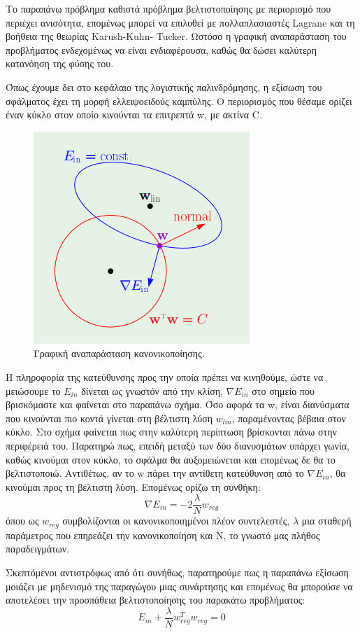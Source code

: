 \documentclass{article}
\begin{document}
Το παραπάνω πρόβλημα καθιστά πρόβλημα βελτιστοποίησης με περιορισμό που περιέχει ανισότητα, επομένως μπορεί να επιλυθεί με πολλαπλασιαστές Lagrane και τη βοήθεια της θεωρίας Karush-Kuhn- Tucker. Ωστόσο η γραφική αναπαράσταση του προβλήματος ενδεχομένως να είναι ενδιαφέρουσα, καθώς θα δώσει καλύτερη κατανόηση της φύσης του.

Όπως έχουμε δει στο κεφάλαιο της λογιστικής παλινδρόμησης, η εξίσωση του σφάλματος έχει τη μορφή ελλειψοειδούς καμπύλης. Ο περιορισμός που θέσαμε ορίζει έναν κύκλο στον οποίο κινούνται τα επιτρεπτά w, με ακτίνα C.
 \begin{figure}[H]
	\centering			
    \includegraphics[scale=0.7]{opt_graph.png}
    \caption[Γραφική αναπαράσταση κανονικοποίησης]{Γραφική αναπαράσταση κανονικοποίησης.}
 \end{figure}
 H πληροφορία της κατεύθυνσης προς την οποία πρέπει να κινηθούμε, ώστε να μειώσουμε το $E_{in}$ δίνεται ως γνωστόν από την κλίση, $\nabla E_{in}$ στο σημείο που βρισκόμαστε και φαίνεται στο παραπάνω σχήμα. Όσο αφορά τα w, είναι διανύσματα που κινούνται πιο κοντά γίνεται στη βέλτιστη λύση $w_{lin}$, παραμένοντας βέβαια στον κύκλο. Στο σχήμα φαίνεται πως στην καλύτερη περίπτωση βρίσκονται πάνω στην περιφέρειά του. Παρατηρώ πως, επειδή μεταξύ των δύο διανυσμάτων υπάρχει γωνία, καθώς κινούμαι στον κύκλο, το σφάλμα θα αυξομειώνεται και επομένως δε θα το βελτιστοποιώ. Αντιθέτως, αν το w πάρει την αντίθετη κατεύθυνση από το  $\nabla E_{in}$, θα κινούμαι προς τη βέλτιστη λύση. Επομένως ορίζω τη συνθήκη:
 $$\nabla E_{in}= - 2 \frac{\lambda}{N} w_{reg}$$
 όπου  ως $w_{reg}$ συμβολίζονται οι κανονικοποιημένοι πλέον συντελεστές, $\lambda$ μια σταθερή παράμετρος που επηρεάζει την κανονικοποίηση και N, το γνωστό μας πλήθος παραδειγμάτων.
 
 Σκεπτόμενοι αντιστρόφως από ότι συνήθως, παρατηρούμε πως η παραπάνω εξίσωση μοιάζει με μηδενισμό της παραγώγου μιας συνάρτησης και επομένως θα μπορούσε να αποτελέσει την προσπάθεια βελτιστοποίησης του παρακάτω προβλήματος:
 $$E_{in} + \frac{\lambda}{N} w^T_{reg} w_{reg}=0$$
 
\end{document}
